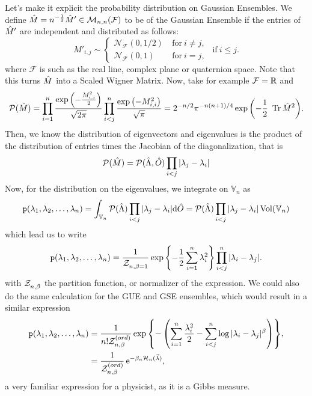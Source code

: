 Let's make it explicit the probability distribution on Gaussian Ensembles. We define $\hat M = n^{-\frac{1}{2}} \hat M' \in \mathcal{M}_{n,n}(\mathcal{F})$ to be of the Gaussian Ensemble if the entries of $\hat M'$ are independent and distributed as follows: 
$$
M'_{i,j} \sim
\begin{cases}
	\mathcal{N}_{\mathcal{F}}(0,1/2) &  \ \text{for} \ i \neq j,\\
	\mathcal{N}_{\mathcal{F}}(0,1) & \ \text{for} \ i = j,
\end{cases}
\ \ \text{if} \ i \leq j.
$$
where $\mathcal{F}$ is such as the real line, complex plane or quaternion space. Note that this turns $\hat M$ into a Scaled Wigner Matrix. Now, take for example $\mathcal{F} = \mathbb{R}$ and 
\begin{equation}
\eP(\m{M}) = \prod_{i=1}^{n}\frac{\exp{\left(-\frac{M_{i,i}^2}{2}\right)}}{\sqrt{2\pi}} \prod_{i<j}^{n} \frac{\exp{\left(-M_{i,i}^2\right)}}{\sqrt{\pi}} = 2^{-n/2} \pi^{-n(n + 1)/4} \exp{\left(-\frac{1}{2} \ \tr{\m{M}^2}\right)}.
\end{equation} 
Then, we know the distribution of eigenvectors and eigenvalues is the product of the distribution of entries times the Jacobian of the diagonalization, that is 
\begin{equation}
 \mathcal{P}(\hat M) = \mathcal{P}(\hat\Lambda, \hat O) \prod_{i<j} |\lambda_j - \lambda_i|
\end{equation}
Now, for the distribution on the eigenvalues, we integrate on $\mathbb{V}_n$ as
\begin{equation}
 \mathtt{p}(\lambda_1, \lambda_2, \dots, \lambda_n) = \int_{\mathbb{V}_n} \mathcal{P}(\hat\Lambda) \prod_{i<j} |\lambda_j - \lambda_i| \mathrm{d} \hat O = \mathcal{P}(\hat\Lambda) \prod_{i<j} |\lambda_j - \lambda_i| \operatorname{Vol}(\mathbb{V}_n)
\end{equation}
which lead us to write
\begin{equation}
\mathtt{p}(\lambda_1, \lambda_2, \dots, \lambda_n) = \frac{1}{\mathcal{Z}_{n, \beta = 1}^{}} \exp{\left\{-\frac{1}{2} \sum_{i = 1}^{n} \lambda_i^2\right\}} \prod_{i < j}^{n} |\lambda_i - \lambda_j|.
\end{equation}
with $\mathcal{Z}_{n, \beta}^{}$ the partition function, or normalizer of the expression. We could also do the same calculation for the GUE and GSE ensembles, which would result in a similar expression
\begin{equation}
	\begin{split}
		\mathtt{p}(\lambda_1, \lambda_2, \dots, \lambda_n) 
		&= \frac{1}{ n! \mathcal{Z}_{n, \beta}^{(ord)}} \exp{\left\{- \left(\sum_{i = 1}^{n} \frac{\lambda_i^2}{2} - \sum_{i < j}^{n} \log{|\lambda_i - \lambda_j|^{\beta}} \right)\right\}}, \\
		&= \frac{1}{\mathcal{Z}_{n, \beta}^{(ord)}} \operatorname{e}^{-\beta_n \mathcal{H}_n(\vec{\lambda})},
	\end{split}
	\label{Equation: medida Gaussian}
\end{equation}
a very familiar expression for a physicist, as it is a Gibbs measure.


